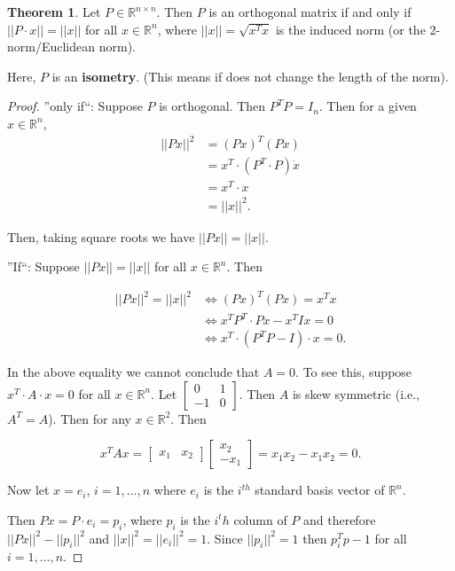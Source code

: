 \documentclass[12pt]{article}
\theoremstyle{definition}
\newtheorem{theorem}{Theorem}[section]  %
\begin{document}
\begin{theorem}
Let $P \in \mathbb{R}^{n \times n}$. Then $P$ is an orthogonal matrix if and only if
$||P \cdot x|| = ||x||$ for all $x \in \mathbb{R}^n$, where $||x|| = \sqrt{x^Tx}$ is
the induced norm (or the 2-norm/Euclidean norm).

Here, $P$ is an \textbf{isometry}. (This means if does not change the length of the
norm).
\end{theorem}

\begin{proof}
''only if``: Suppose $P$ is orthogonal. Then $P^T P = I_n$. Then for a given
$x \in \mathbb{R}^n$, 
\begin{align*}
||Px||^2 &= (Px)^T(Px) \\
&= x^T \cdot (P^T \cdot P) \dot x\\
&= x^T \cdot x \\
&= ||x||^2.
\end{align*}

Then, taking square roots we have $||Px|| = ||x||$.

''If``: Suppose $||Px|| = ||x||$ for all $x \in \mathbb{R}^n$. Then

\begin{align*}
||Px||^2 = ||x||^2 &\iff (Px)^T (Px) = x^T x \\
&\iff x^T P^T \cdot Px - x^T I x = 0 \\
&\iff x^T \cdot (P^T P - I) \cdot x = 0.
\end{align*}

In the above equality we cannot conclude that $A = 0$. To see this, suppose
$x^T \cdot A \cdot x = 0$ for all $x \in \mathbb{R}^n$. Let 
$\displaystyle \begin{bmatrix} 0 & 1 \\ -1 & 0 \end{bmatrix}$. Then $A$ is
skew symmetric (i.e., $A^T = A$). Then for any $x \in \mathbb{R}^2$. Then

\[ x^TAx = \begin{bmatrix} x_1 & x_2 \end{bmatrix} 
\begin{bmatrix} x_2 \\ -x_1 \end{bmatrix} = x_1 x_2 - x_1 x_2 = 0.
\]

Now let $x = e_i$, $i = 1, \ldots, n$ where $e_i$ is the $i^{th}$ standard basis
vector of $\mathbb{R}^n$.

Then $Px = P \cdot e_i = p_i$, where $p_i$ is the $i^th$ column of $P$ and therefore
$||Px||^2 - ||p_i||^2$ and $||x||^2 = ||e_i||^2 = 1$. Since $||p_i||^2 = 1$ then
$p_i^T p - 1$ for all $i = 1, \ldots, n$.


\end{proof}
\end{document}
